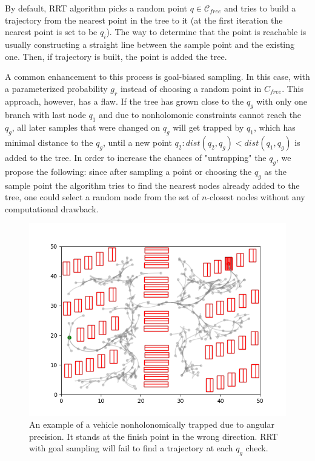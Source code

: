 \documentclass[a4paper,12pt]{article}
\DeclareRobustCommand{\[}{\begin{equation}}
\DeclareRobustCommand{\]}{\end{equation}}
\numberwithin{equation}{section}
\numberwithin{algorithm}{section}
\begin{document}
By default, RRT algorithm picks a random point $q\in\mathcal{C}_{free}$ and tries to build a trajectory from the nearest point in the tree to it (at the first iteration the
nearest point is set to be $q_i$).
The way to determine that the point is reachable is usually constructing a straight line between the sample point and the existing one.
Then, if trajectory is built, the point is added the tree.

A common enhancement to this process is goal-biased sampling. In this case, with a parameterized probability $g_r$ instead of choosing a random point in $C_{free}$. This approach, however,
has a flaw. If the tree has grown close to the $q_g$ with only one branch with last node $q_1$ and due to nonholomonic constraints cannot reach the $q_g$, all later samples that
were changed on $q_g$ will get trapped by $q_1$, which has minimal distance to the $q_g$, until a new point $q_2: dist(q_2, q_g) < dist(q_1, q_g)$ is added to the tree.
In order to increase the chances of "untrapping" the $q_g$, we propose the following: since after sampling a point or choosing the $q_g$ as the sample point the algorithm tries to 
find the nearest nodes already added to the tree, one could select a random node from the set of $n$-closest nodes without any computational drawback.

\begin{figure}[H]
\begin{center}
\includegraphics[scale=0.7]{images/car_trapped.png}
\captionsetup{width=0.6\textwidth}
\caption{An example of a vehicle nonholonomically trapped due to angular precision. It stands at the finish point in the wrong direction. RRT with goal sampling will fail to find a trajectory at each $q_g$ check.}
\end{center}
\end{figure}
\end{document}

